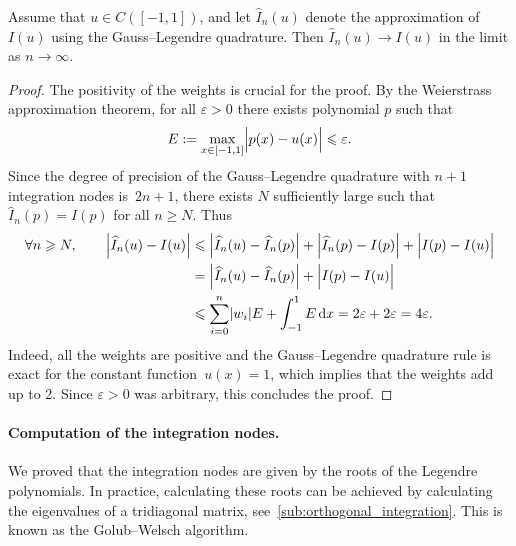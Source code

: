 \begin{theorem}
    Assume that $u \in C([-1, 1])$,
    and let $\widehat I_n(u)$ denote the approximation of~$I(u)$ using the Gauss--Legendre quadrature.
    Then $\widehat I_n(u) \rightarrow I(u)$ in the limit as $n \to \infty$.
\end{theorem}
\begin{proof}
    The positivity of the weights is crucial for the proof.
    By the Weierstrass approximation theorem,
    for all $\varepsilon > 0$ there exists polynomial $p$ such that
    \[
        E := \max_{x \in [-1, 1]} \Bigl\lvert p(x) - u(x) \Bigr\rvert \leq \varepsilon.
    \]
    Since the degree of precision of the Gauss--Legendre quadrature with $n+1$ integration nodes is~$2n+1$,
    there exists $N$ sufficiently large such that $\widehat I_n(p) = I(p)$ for all $n \geq N$.
    Thus
    \begin{align*}
        \forall n \geq N,
        \qquad
        \Bigl\lvert \widehat I_n(u) - I(u) \Bigr\rvert
        &\leq
        \Bigl\lvert \widehat I_n(u) - \widehat I_n(p) \Bigr\rvert
        + \Bigl\lvert \widehat I_n(p) - I(p) \Bigr\rvert
        + \Bigl\lvert I(p) - I(u) \Bigr\rvert \\
        &=
        \Bigl\lvert \widehat I_n(u) - \widehat I_n(p) \Bigr\rvert
        + \Bigl\lvert I(p) - I(u) \Bigr\rvert \\
        &\leq \sum_{i=0}^{n} \lvert w_i \rvert E + \int_{-1}^{1} E \, \d x
        = 2 \varepsilon + 2 \varepsilon = 4 \varepsilon.
    \end{align*}
    Indeed, all the weights are positive
    and the Gauss--Legendre quadrature rule is exact for the constant function~$u(x) = 1$,
    which implies that the weights add up to 2.
    Since $\varepsilon > 0$ was arbitrary,
    this concludes the proof.
\end{proof}

\paragraph{Computation of the integration nodes.}
We proved that the integration nodes are given by the roots of the Legendre polynomials.
In practice, calculating these roots can be achieved by calculating the eigenvalues of a tridiagonal matrix, see~\cref{sub:orthogonal_integration}.
This is known as the Golub--Welsch algorithm.

